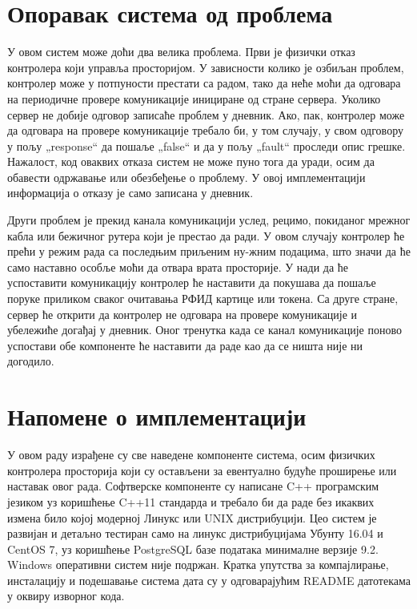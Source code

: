 \documentclass[a4paper, 12pt, diplomski]{etfcyr}
\def\quote#1{„#1“}
\begin{document}
		\section{Опоравак система од проблема}
			\begin{justify}
				У овом систем може доћи два велика проблема. Први је физички отказ контролера који управља просторијом. У зависности колико је озбиљан проблем, контролер може у потпуности престати са радом, тако да неће моћи да одговара на периодичне провере комуникације инициране од стране сервера. Уколико сервер не добије одговор записаће проблем у дневник. Ако, пак, контролер може да одговара на провере комуникације требало би, у том случају, у свом одговору у пољу \quote{response} да пошаље \quote{false} и да у пољу \quote{fault} проследи опис грешке. Нажалост, код оваквих отказа систем не може пуно тога да уради, осим да обавести одржавање или обезбеђење о проблему. У овој имплементацији информација о отказу је само записана у дневник.

				Други проблем је прекид канала комуникацији услед, рецимо, покиданог мрежног кабла или бежичног рутера који је престао да ради. У овом случају контролер ће прећи у режим рада са последњим приљеним ну-жним подацима, што значи да ће само наставно особље моћи да отвара врата просторије. У нади да ће успоставити комуникацију контролер ће наставити да покушава да пошаље поруке приликом сваког очитавања РФИД картице или токена. Са друге стране, сервер ће открити да контролер не одговара на провере комуникације и убележиће догађај у дневник. Оног тренутка када се канал комуникације поново успостави обе компоненте ће наставити да раде као да се ништа није ни догодило.
			\end{justify}

		\section{Напомене о имплементацији}
			\begin{justify}
				У овом раду израђене су све наведене компоненте система, осим физичких контролера просторија који су остављени за евентуално будуће проширење или наставак овог рада. Софтверске компоненте су написане C++ програмским језиком уз коришћење C++11 стандарда и требало би да раде без икаквих измена било којој модерној Линукс или UNIX дистрибуцији. Цео систем је развијан и детаљно тестиран само на линукс дистрибуцијама Убунту 16.04 и CentOS 7, уз коришћење PostgreSQL базе података минималне верзије 9.2. Windows оперативни систем није подржан. Кратка упутства за компајлирање, инсталацију и подешавање система дата су у одговарајућим README датотекама у оквиру изворног кода.
			\end{justify}
\end{document}
